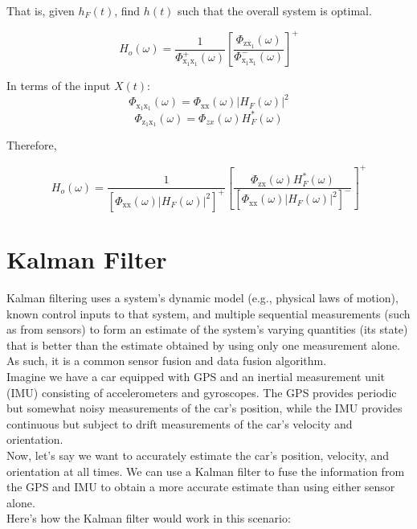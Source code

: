 \documentclass[12pt]{book}
\theoremstyle{definition}
\begin{document}
That is, given $h_F(t)$, find $h(t)$ such that the overall system is optimal.

\[
H_o(\omega) = \frac{1}{\Phi_\mathrm{x_1 x_1}^+(\omega) }\left [\frac{\Phi_\mathrm{zx_1}(\omega)}{\Phi_\mathrm{x_1 x_1}^-(\omega)} \right ]^+
\]

In terms of the input $X(t)$:
\[
\Phi_\mathrm{x_1 x_1}(\omega) = \Phi_\mathrm{xx}(\omega)\left | H_F(\omega) \right |^2
\]
\[
\Phi_\mathrm{z_1x_1}(\omega) = \Phi_{zx}(\omega) H_F^*(\omega)
\]

Therefore,

\[
H_o(\omega) = \frac{1}{\left [ \Phi_\mathrm{xx}(\omega)\left | H_F(\omega) \right |^2 \right ]^+ } \left [\frac{\Phi_\mathrm{zx}(\omega) H_F^*(\omega)}{\left [ \Phi_\mathrm{xx}(\omega)\left | H_F(\omega) \right |^2 \right ]^- }  \right ]^+
\]
\section{Kalman Filter}
Kalman filtering uses a system's dynamic model (e.g., physical laws of motion), known control inputs to that system, and multiple sequential measurements (such as from sensors) to form an estimate of the system's varying quantities (its state) that is better than the estimate obtained by using only one measurement alone. As such, it is a common sensor fusion and data fusion algorithm.\\


Imagine we have a car equipped with GPS and an inertial measurement unit (IMU) consisting of accelerometers and gyroscopes. The GPS provides periodic but somewhat noisy measurements of the car's position, while the IMU provides continuous but subject to drift measurements of the car's velocity and orientation.\\

Now, let's say we want to accurately estimate the car's position, velocity, and orientation at all times. We can use a Kalman filter to fuse the information from the GPS and IMU to obtain a more accurate estimate than using either sensor alone. \\

Here's how the Kalman filter would work in this scenario:
\end{document}
